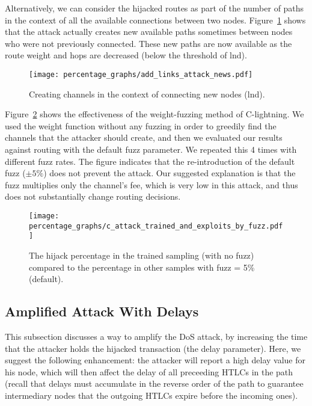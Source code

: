 Alternatively, we can consider the hijacked routes as part of the number of paths in the context of all the available connections between two nodes. Figure~\ref{figure::hijack_attack_new_paths} shows that the attack actually creates new available paths sometimes between nodes who were not previously connected. These new paths are now available 
as the route weight and hops are decreased (below the threshold of lnd).
    \begin{figure} 
    	\centering
    	\texttt{[image: percentage\_graphs/add\_links\_attack\_news.pdf]}
    	\caption{Creating channels in the context of connecting new nodes (lnd).}
    	\label{figure::hijack_attack_new_paths}
    \end{figure}
    
Figure~\ref{figure::hijack_attack_fuzz_impact} shows the effectiveness of the weight-fuzzing method of C-lightning. We used the weight function without any fuzzing in order to greedily find the channels that the attacker should create, and then we evaluated our results against routing with the default fuzz parameter. We repeated this 4 times with different fuzz rates. The figure indicates that the re-introduction of the default fuzz ($\pm 5 \%$) does not prevent the attack. Our suggested explanation is that the fuzz multiplies
only the channel's fee, which is very low in this attack, and thus does not substantially change routing decisions. 
    
    \begin{figure} 
    	\centering
    	\texttt{[image: percentage\_graphs/c\_attack\_trained\_and\_exploits\_by\_fuzz.pdf]}
    	\caption{The hijack percentage in the trained sampling (with no fuzz) 
    	compared to the percentage in other samples with fuzz = 5\% (default).}
    	\label{figure::hijack_attack_fuzz_impact}
    \end{figure}
    
\subsection{Amplified Attack With Delays}

This subsection discusses a way to amplify the DoS attack, by increasing the time that the attacker holds the hijacked transaction (the delay parameter). Here, we suggest the following enhancement: the attacker will report a high delay value for his node, which will then affect the delay of all preceeding HTLCs in the path (recall that delays must accumulate in the reverse order of the path to guarantee intermediary nodes that the outgoing HTLCs expire before the incoming ones).

